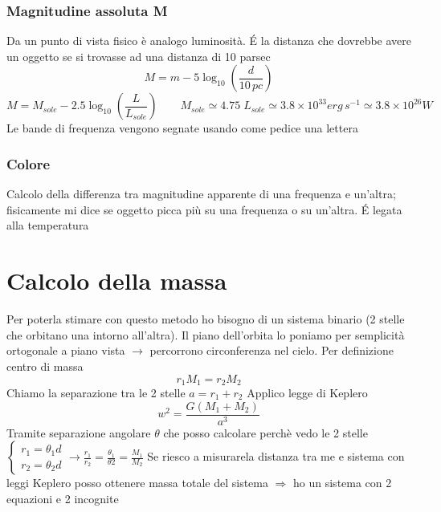 \documentclass[a4paper,11pt]{report}
\theoremstyle{remark}
\theoremstyle{definition}
\begin{document}
\subsubsection*{Magnitudine assoluta M}
Da un punto di vista fisico è analogo luminosità. \'E la distanza che dovrebbe avere un oggetto se si trovasse ad una distanza di 10 parsec
\begin{equation*}
    M = m - 5\log_{10} \left(\frac{d}{10 \, pc}\right)
\end{equation*}
\begin{equation*}
    M = M_{sole} - 2.5 \log_{10}\left(\frac{L}{L_{sole}}\right) \qquad M_{sole} \simeq 4.75 \; L_{sole} \simeq 3.8 \times 10^{33} erg \, s^{-1} \simeq 3.8 \times 10^{26} W
\end{equation*}
Le bande di frequenza vengono segnate usando come pedice una lettera

\subsubsection*{Colore}
Calcolo della differenza tra magnitudine apparente di una frequenza e un'altra; fisicamente mi dice se oggetto picca più su una frequenza o su un'altra. \'E legata alla temperatura

\section*{Calcolo della massa}
Per poterla stimare con questo metodo ho bisogno di un sistema binario (2 stelle che orbitano una intorno all'altra). Il piano dell'orbita lo poniamo per semplicità ortogonale a piano vista $\rightarrow$ percorrono circonferenza nel cielo. \newline
Per definizione centro di massa
\begin{equation*}
    r_1M_1 = r_2M_2
\end{equation*}
Chiamo la separazione tra le 2 stelle $a = r_1+r_2$ \newline
Applico legge di Keplero
\begin{equation*}
    w^2 = \frac{G(M_1+M_2)}{a^3}
\end{equation*}
Tramite separazione angolare $\theta$ che posso calcolare perchè vedo le 2 stelle 
$\begin{cases*}
    r_1 = \theta_1 d \\
    r_2 = \theta_2 d
\end{cases*} 
\rightarrow \frac{r_1}{r_2} = \frac{\theta_1}{\theta2}= \frac{M_1}{M_2}$ \newline
Se riesco a misurarela distanza tra me e sistema con leggi Keplero posso ottenere massa totale del sistema $\Rightarrow$ ho un sistema con 2 equazioni e 2 incognite
\end{document}
